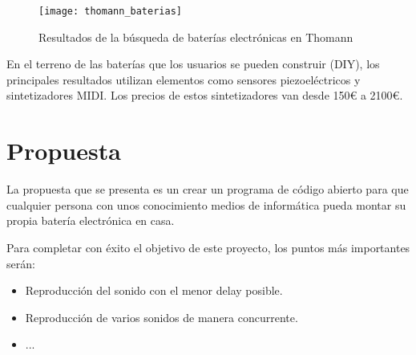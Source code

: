         \begin{figure}[ht]
            \centering
            \texttt{[image: thomann\_baterias]}
            \caption{Resultados de la búsqueda de baterías electrónicas en Thomann \cite{thomann_baterias}
                     \label{fig:ThomannBusqueda}}
        \end{figure}

        \newpage

        En el terreno de las baterías que los usuarios se pueden construir (DIY), los principales resultados
        \cite{drum_magazine_diy_kit} utilizan elementos como sensores piezoeléctricos y sintetizadores MIDI. Los precios
        de estos sintetizadores van desde 150\euro{} a 2100\euro{}.


    \section{Propuesta} %
    \label{sec:Propuesta}

        La propuesta que se presenta es un crear un programa de código abierto para que cualquier persona con unos
        conocimiento medios de informática pueda montar su propia batería electrónica en casa.

        Para completar con éxito el objetivo de este proyecto, los puntos más importantes serán:
        \begin{itemize}
            \item Reproducción del sonido con el menor delay posible.
            \item Reproducción de varios sonidos de manera concurrente.
            \item ...
        \end{itemize}



\newpage
